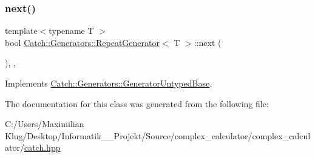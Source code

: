 \mbox{\label{class_catch_1_1_generators_1_1_repeat_generator_a24d5c2b1c09d6d220d4bd4c83f222dcb}} 
\subsubsection{\texorpdfstring{next()}{next()}}
{\footnotesize\ttfamily template$<$typename T $>$ \\
bool \mbox{\hyperlink{class_catch_1_1_generators_1_1_repeat_generator}{Catch\+::\+Generators\+::\+Repeat\+Generator}}$<$ T $>$\+::next (\begin{DoxyParamCaption}{ }\end{DoxyParamCaption})\hspace{0.3cm}{\ttfamily [inline]}, {\ttfamily [override]}, {\ttfamily [virtual]}}



Implements \mbox{\hyperlink{class_catch_1_1_generators_1_1_generator_untyped_base_aeed3c0cd6233c5f553549e453b8d6638}{Catch\+::\+Generators\+::\+Generator\+Untyped\+Base}}.



The documentation for this class was generated from the following file\+:\begin{DoxyCompactItemize}
\item 
C\+:/\+Users/\+Maximilian Klug/\+Desktop/\+Informatik\+\_\+\_\+\+Projekt/\+Source/complex\+\_\+calculator/complex\+\_\+calculator/\mbox{\hyperlink{catch_8hpp}{catch.\+hpp}}\end{DoxyCompactItemize}
